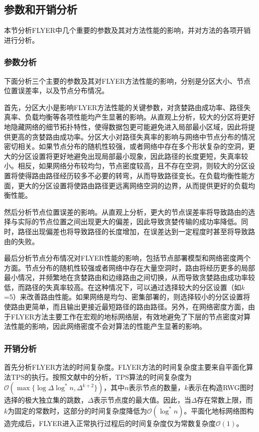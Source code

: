 \subsection{参数和开销分析}
本节分析FLYER中几个重要的参数及其对方法性能的影响，并对方法的各项开销进行分析。
\subsubsection{参数分析}
下面分析三个主要的参数及其对FLYER方法性能的影响，分别是分区大小、节点位置误差率，以及节点分布情况。

首先，分区大小是影响FLYER方法性能的关键参数，对贪婪路由成功率、路径失真率、负载均衡等各项性能均产生显著的影响。从直观上分析，较大的分区将更好地隐藏网络的细节拓扑特性，使得数据包更可能避免进入局部最小区域，因此将提供更高的贪婪路由成功率。分区大小对路径失真率的影响与网络中节点分布的情况密切相关。如果节点分布的随机性较强，或者网络中存在多个形状复杂的空洞，更大的分区设置将更好地避免出现局部最小现象，因此路径的长度更短，失真率较小。相反，如果网络分布较均匀，节点密度较高，且不存在空洞，则较大的分区设置将使得路由路径经历较多不必要的转弯，从而导致路径变长。在负载均衡性能方面，更大的分区设置将使路由路径更远离网络空洞的边界，从而提供更好的负载均衡性能。

然后分析节点位置误差的影响。从直观上分析，更大的节点误差率将导致路由的选择与实际的节点位置之间出现更大的偏差，因此导致贪婪传输的成功率降低。同时，路径出现偏差也将导致路径的长度增加，在误差达到一定程度时甚至将导致路由的失败。

最后分析节点分布情况对FLYER性能的影响，包括节点部署模型和网络密度两个方面。节点分布的随机性较强或者网络中存在大量空洞时，路由将经历更多的局部最小情况，并频繁地在贪婪路由和边缘路由之间切换，从而导致贪婪路由成功率较低，而路径的失真率较高。在这种情况下，可以通过选择较大的分区设置（如$k$=5）来改善路由性能。如果网络是均匀、密集部署的，则选择较小的分区设置将使路由更简单，而且输出更接近最短路径的路由路径。另外，在网络密度方面，由于FLYER方法主要工作在宏观的地标网络层，有效地避免了下层的节点密度对算法性能的影响，因此网络密度不会对算法的性能产生显著的影响。
\subsubsection{开销分析}
首先分析FLYER方法的时间复杂度。FLYER方法的时间复杂度主要来自平面化算法TPS的执行。按照文献中的分析，TPS算法的时间复杂度为$\mathcal{O}(\max\{\log\Delta\log^*n,\Delta^{k+2}\})$，其中$n$表示节点的数量，$k$表示在构造RWG图时选择的极大独立集的跳数，$\Delta$表示节点度的最大值。因此，当$\Delta$存在常数上限，而$k$为固定的常数时，这部分的时间复杂度降低为$\mathcal{O}(\log^*n)$。平面化地标网络图构造完成后，FLYER进入正常执行过程后的时间复杂度仅为常数复杂度$\mathcal{O}(1)$。

